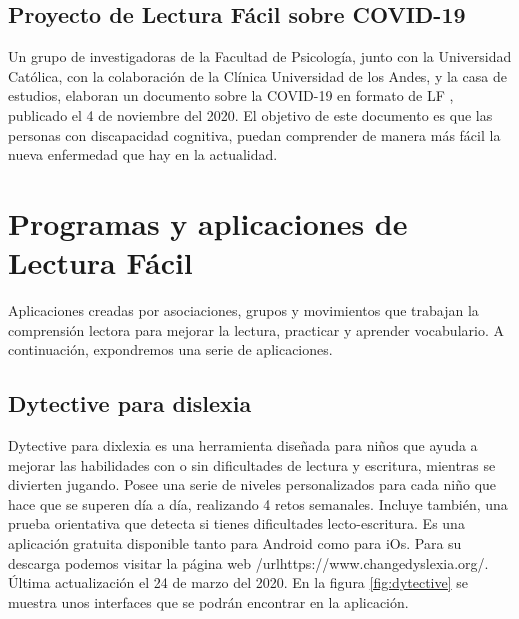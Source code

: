 \subsection{Proyecto de Lectura Fácil sobre COVID-19}

Un grupo de investigadoras de la Facultad de Psicología, junto con la Universidad Católica, con la colaboración de la Clínica Universidad de los Andes, y la casa de estudios, elaboran un documento sobre la COVID-19 en formato de LF \citep{covid}, publicado el 4 de noviembre del 2020.
El objetivo de este documento es que las personas con discapacidad cognitiva, puedan comprender de manera más fácil la nueva enfermedad que hay en la actualidad.


\section{Programas y aplicaciones de Lectura Fácil}

Aplicaciones creadas por asociaciones, grupos y movimientos que trabajan la comprensión lectora para mejorar la lectura, practicar y aprender vocabulario. A continuación, expondremos una serie de aplicaciones.

\subsection{Dytective para dislexia }
Dytective para dixlexia \citep{rello2018superar} es una herramienta diseñada para niños que ayuda a mejorar las habilidades con o sin dificultades de lectura y escritura, mientras se divierten jugando. Posee una serie de niveles personalizados para cada niño que hace que se superen día a día, realizando 4 retos semanales. Incluye también, una prueba orientativa que detecta si tienes dificultades lecto-escritura.
Es una aplicación gratuita disponible tanto para Android como para iOs. Para su descarga podemos visitar la página web /url{https://www.changedyslexia.org/}. Última actualización el 24 de marzo del 2020. En la figura \ref{fig:dytective} se muestra unos interfaces que se podrán encontrar en la aplicación.


